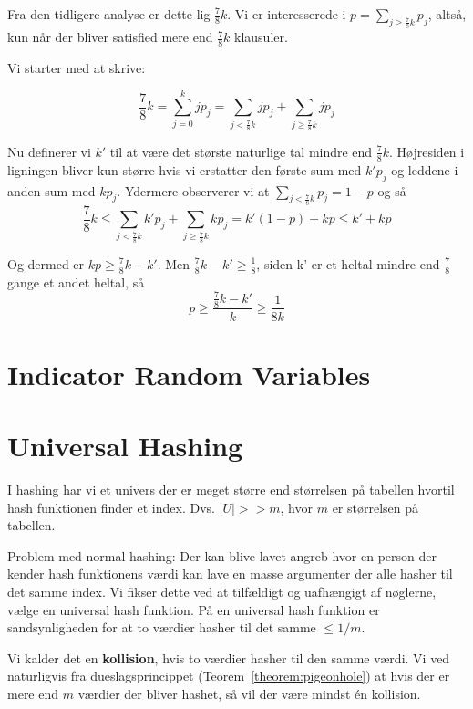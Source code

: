 \documentclass[11pt]{article}
\theoremstyle{definition}
\theoremstyle{remark}
\begin{document}
Fra den tidligere analyse er dette lig $\frac{7}{8}k$.
Vi er interesserede i $p = \sum_{j \geq \frac{7}{8}k}^{}p_{j}$, altså, kun når der bliver satisfied mere end $\frac{7}{8}k$ klausuler.

Vi starter med at skrive:

\[
\frac{7}{8}k = \sum_{j=0}^{k}jp_{j} = \sum_{j < \frac{7}{8}k}^{} jp_{j} + \sum_{j \geq \frac{7}{8}k}^{} j p_{j}
\]

Nu definerer vi $k'$ til at være det største naturlige tal mindre end $\frac{7}{8}k$. Højresiden i ligningen bliver kun større hvis vi erstatter den første sum med $k'p_{j}$ og leddene i anden sum med $kp_{j}$. Ydermere observerer vi at $\sum_{j < \frac{7}{8}k}^{}p_{j} = 1 - p$ og så
\[
\frac{7}{8}k \leq \sum_{j < \frac{7}{8}k}^{} k'p_{j} + \sum_{j \geq \frac{7}{8}k}^{}kp_{j} = k'(1-p)+kp \leq k' + kp
\]

Og dermed er $kp \geq \frac{7}{8}k - k'$. Men $\frac{7}{8}k - k' \geq \frac{1}{8}$, siden k' er et heltal mindre end $\frac{7}{8}$ gange et andet heltal, så
\[
p \geq \frac{\frac{7}{8}k - k'}{k} \geq \frac{1}{8k}
\]


\label{subsec:label}



\newpage

\section{Indicator Random Variables}
\label{sec:indicator}

\section{Universal Hashing}
\label{sec:hashing}


I hashing har vi et univers der er meget større end størrelsen på tabellen hvortil hash funktionen finder et index. Dvs. $|U| >> m$, hvor $m$ er størrelsen på tabellen.

Problem med normal hashing: Der kan blive lavet angreb hvor en person der kender hash funktionens værdi kan lave en masse argumenter der alle hasher til det samme index. Vi fikser dette ved at tilfældigt og uafhængigt af nøglerne, vælge en universal hash funktion. På en universal hash funktion er sandsynligheden for at to værdier hasher til det samme $\leq 1/m$.

Vi kalder det en \textbf{kollision}, hvis to værdier hasher til den samme værdi. Vi ved naturligvis fra dueslagsprincippet (Teorem~\ref{theorem:pigeonhole}) at hvis der er mere end $m$ værdier der bliver hashet, så vil der være mindst én kollision. 
\end{document}
